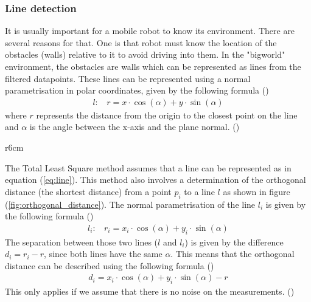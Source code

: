 \documentclass[../Head/Main.tex]{subfiles}
\begin{document}
\subsubsection{Line detection}
It is usually important for a mobile robot to know its environment. There are several reasons for that. One is that robot must know the location of the obstacles (walls) relative to it to avoid driving into them. In the "bigworld" environment, the obstacles are walls which can be represented as lines from the filtered datapoints. These lines can be represented using a normal parametrisation in polar coordinates, given by the following formula (\cite[1-3]{TLSM})
\begin{align}
    l:~~~~r = x\cdot\cos(\alpha)+y\cdot\sin(\alpha)
    \label{eq:line}
\end{align}
where $r$ represents the distance from the origin to the closest point on the line and $\alpha$ is the angle between the x-axis and the plane normal. (\cite[1-3]{TLSM})
\par
\begin{wrapfigure}{r}{6cm}
	\vspace{-12pt}
	\centering
	
	\vspace{-5pt}
	\caption{Orthogonal distance from point $p_1$ to line $l$}
	\label{fig:orthogonal_distance}
	\vspace{-5pt}
\end{wrapfigure}
The Total Least Square method assumes that a line can be represented as in equation (\ref{eq:line}). This method also involves a determination of the orthogonal distance (the shortest distance) from a point $p_i$ to a line $l$ as shown in  figure (\ref{fig:orthogonal_distance}). The normal parametrisation of the line $l_i$ is given by the following formula (\cite[1-3]{TLSM})
\begin{align}
    l_i:~~~~r_i = x_i\cdot\cos(\alpha)+y_i\cdot\sin(\alpha)
\end{align}
The separation between those two lines ($l$ and $l_i$) is given by the difference $d_i=r_i-r$, since both lines have the same $\alpha$. This means that the orthogonal distance can be described using the following formula (\cite[1-3]{TLSM})
\begin{align}
    d_i = x_i\cdot\cos(\alpha)+y_i\cdot\sin(\alpha) - r
\end{align}
This only applies if we assume that there is no noise on the measurements. (\cite[1-3]{TLSM})
\end{document}
